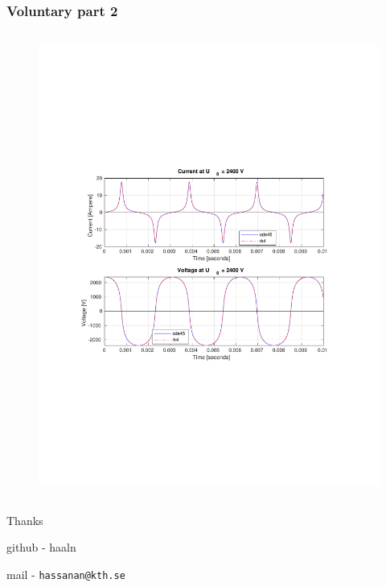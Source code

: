 \documentclass[aspectratio=1610]{beamer}
\begin{document}
\begin{frame}
\frametitle{Voluntary part 2}
	\begin{columns}
			\begin{figure}
				\includegraphics[scale=0.7]{figs/voluntary_2_2400V.pdf}
			\end{figure}
	\end{columns}
\end{frame}

\begin{frame}
\Large{\centerline{Thanks}}

\vspace{0.25\textheight}

\small{{github - haaln}}\\ \*

\small{{mail - \tt hassanan@kth.se}}
\end{frame}
\end{document}

